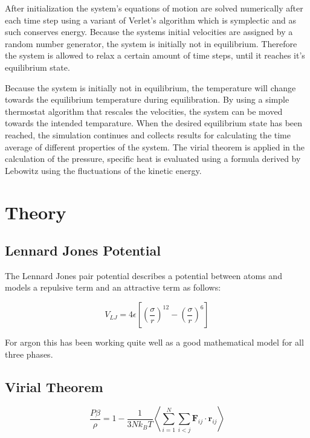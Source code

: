 \documentclass[
10pt, %
a4paper, %
oneside, %
headinclude,footinclude, %
BCOR5mm, %
]{scrartcl}
\begin{document}
After initialization the system's equations of motion are solved numerically after each time step using a variant of Verlet's algorithm which is symplectic and as such conserves energy.  Because the systems initial velocities are assigned by a random number generator, the system is initially not in equilibrium. Therefore the system is allowed to relax a certain amount of time steps, until it reaches it's equilibrium state.

Because the system is initially not in equilibrium, the temperature will change towards the equilibrium temperature during equilibration. By using a simple thermostat algorithm that rescales the velocities, the system can be moved towards the intended temparature. When the desired equilibrium state has been reached, the simulation continues and collects results for calculating the time average of different properties of the system. The virial theorem is applied in the calculation of the pressure, specific heat is evaluated using a formula derived by Lebowitz using the fluctuations of the kinetic energy\cite{Duane:1985lz}.

 
\newpage

\section{Theory}


\subsection{Lennard Jones Potential}

The Lennard Jones pair potential describes a potential between atoms and models a repulsive term and an attractive term as follows:

$$ V_{LJ} =  4 \epsilon \left [ \left (\frac{\sigma}{r} \right )^{12} - \left ( \frac{\sigma}{r} \right )^6 \right ] $$

For argon this has been working quite well as a good mathematical model for all three phases\cite{Rahman}. 
 

\subsection{Virial Theorem}

\begin{equation}
\frac{P \beta}{\rho}=1-\frac{1}{3Nk_BT} \left<  \sum_{i=1}^{N} \sum_{i < j}  \mathbf{F}_{ij} \cdot \mathbf{r}_{ij} \right>
\end{equation}
\end{document}
